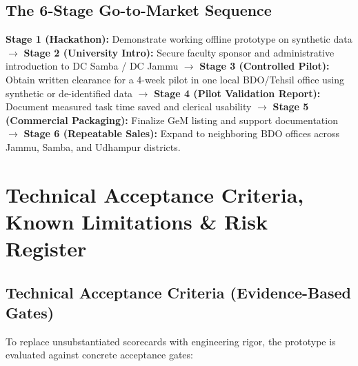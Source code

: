 \documentclass[11pt,a4paper]{article}
\begin{document}
\subsection{The 6-Stage Go-to-Market Sequence}
\textbf{Stage 1 (Hackathon):} Demonstrate working offline prototype on synthetic data $\rightarrow$ \textbf{Stage 2 (University Intro):} Secure faculty sponsor and administrative introduction to DC Samba / DC Jammu $\rightarrow$ \textbf{Stage 3 (Controlled Pilot):} Obtain written clearance for a 4-week pilot in one local BDO/Tehsil office using synthetic or de-identified data $\rightarrow$ \textbf{Stage 4 (Pilot Validation Report):} Document measured task time saved and clerical usability $\rightarrow$ \textbf{Stage 5 (Commercial Packaging):} Finalize GeM listing and support documentation $\rightarrow$ \textbf{Stage 6 (Repeatable Sales):} Expand to neighboring BDO offices across Jammu, Samba, and Udhampur districts.

\vspace{0.2cm}

\section{Technical Acceptance Criteria, Known Limitations \& Risk Register}

\subsection{Technical Acceptance Criteria (Evidence-Based Gates)}
To replace unsubstantiated scorecards with engineering rigor, the prototype is evaluated against concrete acceptance gates:
\end{document}
